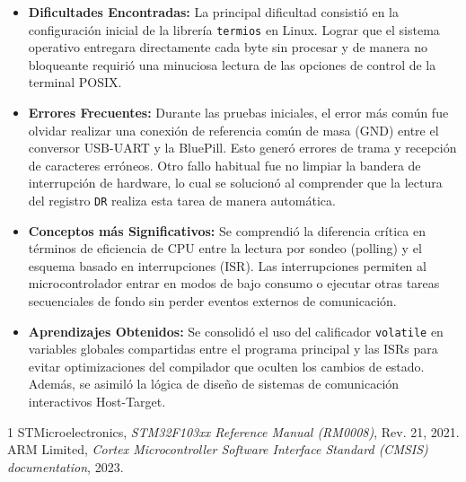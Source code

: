 \documentclass{plantilla}
\begin{document}
\begin{itemize}
    \item \textbf{Dificultades Encontradas:} La principal dificultad consistió en la configuración inicial de la librería \texttt{termios} en Linux. Lograr que el sistema operativo entregara directamente cada byte sin procesar y de manera no bloqueante requirió una minuciosa lectura de las opciones de control de la terminal POSIX.
    \item \textbf{Errores Frecuentes:} Durante las pruebas iniciales, el error más común fue olvidar realizar una conexión de referencia común de masa (GND) entre el conversor USB-UART y la BluePill. Esto generó errores de trama y recepción de caracteres erróneos. Otro fallo habitual fue no limpiar la bandera de interrupción de hardware, lo cual se solucionó al comprender que la lectura del registro \texttt{DR} realiza esta tarea de manera automática.
    \item \textbf{Conceptos más Significativos:} Se comprendió la diferencia crítica en términos de eficiencia de CPU entre la lectura por sondeo (polling) y el esquema basado en interrupciones (ISR). Las interrupciones permiten al microcontrolador entrar en modos de bajo consumo o ejecutar otras tareas secuenciales de fondo sin perder eventos externos de comunicación.
    \item \textbf{Aprendizajes Obtenidos:} Se consolidó el uso del calificador \texttt{volatile} en variables globales compartidas entre el programa principal y las ISRs para evitar optimizaciones del compilador que oculten los cambios de estado. Además, se asimiló la lógica de diseño de sistemas de comunicación interactivos Host-Target.
\end{itemize}

\begin{thebibliography}{1}
STMicroelectronics, \emph{STM32F103xx Reference Manual (RM0008)}, Rev. 21, 2021.
ARM Limited, \emph{Cortex Microcontroller Software Interface Standard (CMSIS) documentation}, 2023.
\end{thebibliography}
\end{document}
